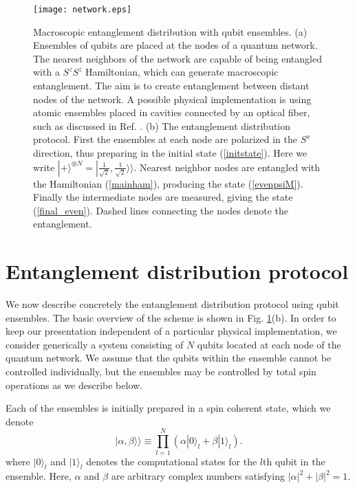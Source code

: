 \documentclass[%
  prx,%
  twocolumn,%
  preprintnumbers,%
  amsmath,%
  amssymb,%
  superscriptaddress%
]{revtex4}
\begin{document}
\begin{figure}[t]
\centering
\texttt{[image: network.eps]}
\caption{\label{fig1}
Macroscopic entanglement distribution with qubit ensembles.  (a) Ensembles of qubits are placed at the nodes of a quantum network.  The nearest neighbors of the network are capable of being entangled with a $ S^z S^z $ Hamiltonian, which can generate macroscopic entanglement.  The aim is to create entanglement between distant nodes of the network.  A possible physical implementation is using atomic ensembles placed in cavities connected by an optical fiber, such as discussed in Ref. \cite{pyrkov2013entanglement}. 
(b) The entanglement distribution protocol.  First the ensembles at each node are polarized in the $ S^x $ direction, thus preparing in the initial state (\ref{initstate}).  Here we write $ | + \rangle^{\otimes N } = | \frac{1}{\sqrt{2}}, \frac{1}{\sqrt{2}} 
\rangle \rangle $. Nearest neighbor nodes are entangled with the Hamiltonian (\ref{mainham}), producing the state (\ref{evenpsiM}).  Finally the intermediate nodes are measured, giving the state (\ref{final_even}). Dashed lines connecting the nodes denote the entanglement.    }
\end{figure} 























\section{Entanglement distribution protocol}

We now describe concretely the entanglement distribution protocol using qubit ensembles. The basic overview of the scheme is shown in Fig. \ref{fig1}(b).  In order to keep our presentation independent of a particular physical implementation, we consider generically a system consisting of $ N $ qubits located at each node of the quantum network.  We assume that the qubits within the ensemble cannot be controlled individually, but the ensembles may be controlled by total spin operations as we describe below. 

Each of the ensembles is initially prepared in a spin coherent state, which we denote 
%
\begin{equation}
\label{ensemblequbit}
|\alpha,\beta\rangle\rangle\equiv \prod_{l=1}^N (\alpha |0\rangle_l +\beta |1 \rangle_l).  
\end{equation}
%
where $ |0\rangle_l $ and $ |1\rangle_l $ denotes the computational states for the $l$th qubit in the ensemble.  Here, $\alpha$ and $\beta$ are arbitrary complex numbers satisfying $|\alpha|^2+|\beta|^2=1$. 
\end{document}
